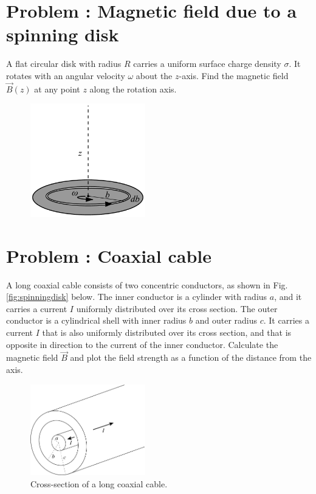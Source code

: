 \documentclass[problems]{esg8022pset}
\begin{document}
\section{Problem \thesection: Magnetic field due to a spinning disk}
A flat circular disk with radius $R$ carries a uniform surface charge density
$\sigma$. It rotates with an angular velocity $\omega$ about the $z$-axis.
Find the magnetic field $\vec{B}(z)$ at any point $z$ along the rotation axis.

   \begin{figure}[ht]
    \centering
    \includegraphics[width = 5cm]{Spinningdisk}
    \label{fig:spinningdisk}
  \end{figure}

\section{Problem \thesection: Coaxial cable}
A long coaxial cable consists of two concentric conductors, as shown in Fig. \autoref{fig:spinningdisk} below.
The inner conductor is a cylinder with radius $a$, and it carries a current $I$
uniformly distributed over its cross section. The outer conductor is a cylindrical shell with
inner radius $b$ and outer radius $c$. It carries a current $I$ that is also uniformly
distributed over its cross section, and that is opposite in direction to the current of the
inner conductor.  Calculate the magnetic field $\vec{B}$  and plot the field strength as a function of
the distance from the axis.

   \begin{figure}[ht]
    \centering
    \includegraphics[width = 5cm]{coax}
    \caption{Cross-section of a long coaxial cable.}
    \label{fig:spinningdisk}
  \end{figure}
\end{document}
